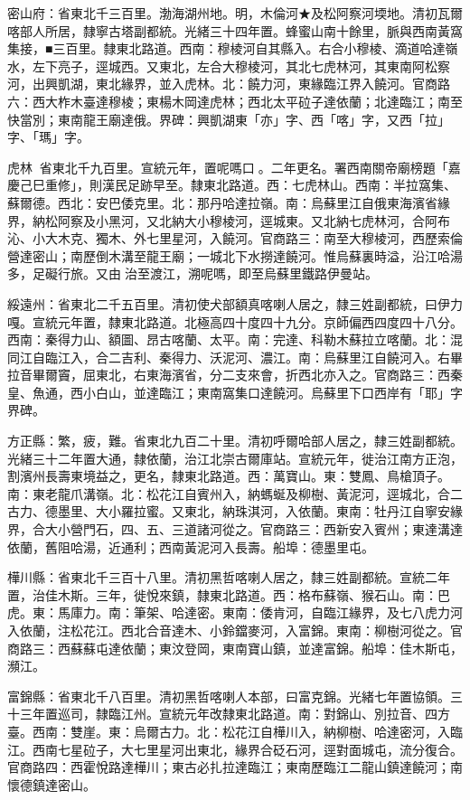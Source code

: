 \begin{pinyinscope}
密山府：省東北千三百里。渤海湖州地。明，木倫河★及松阿察河堧地。清初瓦爾喀部人所居，隸寧古塔副都統。光緒三十四年置。蜂蜜山南十餘里，脈與西南黃窩集接，■三百里。隸東北路道。西南：穆棱河自其縣入。右合小穆棱、滴道哈達嶺水，左下亮子，逕城西。又東北，左合大穆棱河，其北七虎林河，其東南阿松察河，出興凱湖，東北緣界，並入虎林。北：饒力河，東緣臨江界入饒河。官商路六：西大柞木臺達穆棱；東楊木岡達虎林；西北太平砬子達依蘭；北達臨江；南至快當別；東南龍王廟達俄。界碑：興凱湖東「亦」字、西「喀」字，又西「拉」字、「瑪」字。

虎林：省東北千九百里。宣統元年，置呢嗎口。二年更名。署西南關帝廟榜題「嘉慶己巳重修」，則漢民足跡早至。隸東北路道。西：七虎林山。西南：半拉窩集、蘇爾德。西北：安巴倭克里。北：那丹哈達拉嶺。南：烏蘇里江自俄東海濱省緣界，納松阿察及小黑河，又北納大小穆棱河，逕城東。又北納七虎林河，合阿布沁、小大木克、獨木、外七里星河，入饒河。官商路三：南至大穆棱河，西歷索倫營達密山；南歷倒木溝至龍王廟；一城北下水撈達饒河。惟烏蘇裏時溢，沿江哈湯多，足礙行旅。又由治至渡江，溯呢嗎，即至烏蘇里鐵路伊曼站。

綏遠州：省東北二千五百里。清初使犬部額真喀喇人居之，隸三姓副都統，曰伊力嘎。宣統元年置，隸東北路道。北極高四十度四十九分。京師偏西四度四十八分。西南：秦得力山、額圖、昂古喀蘭、太平。南：完達、科勒木蘇拉立喀蘭。北：混同江自臨江入，合二吉利、秦得力、沃泥河、濃江。南：烏蘇里江自饒河入。右畢拉音畢爾竇，屈東北，右東海濱省，分二支來會，折西北亦入之。官商路三：西秦皇、魚通，西小白山，並達臨江；東南窩集口達饒河。烏蘇里下口西岸有「耶」字界碑。

方正縣：繁，疲，難。省東北九百二十里。清初呼爾哈部人居之，隸三姓副都統。光緒三十二年置大通，隸依蘭，治江北崇古爾庫站。宣統元年，徙治江南方正泡，割濱州長壽東境益之，更名，隸東北路道。西：萬寶山。東：雙鳳、鳥槍頂子。南：東老龍爪溝嶺。北：松花江自賓州入，納螞蜒及柳樹、黃泥河，逕城北，合二古力、德墨里、大小羅拉蜜。又東北，納珠淇河，入依蘭。東南：牡丹江自寧安緣界，合大小營門石，四、五、三道諸河從之。官商路三：西新安入賓州；東達溝達依蘭，舊阻哈湯，近通利；西南黃泥河入長壽。船埠：德墨里屯。

樺川縣：省東北千三百十八里。清初黑哲喀喇人居之，隸三姓副都統。宣統二年置，治佳木斯。三年，徙悅來鎮，隸東北路道。西：格布蘇嶺、猴石山。南：巴虎。東：馬庫力。南：筆架、哈達密。東南：倭肯河，自臨江緣界，及七八虎力河入依蘭，注松花江。西北合音達木、小鈴鐺麥河，入富錦。東南：柳樹河從之。官商路三：西蘇蘇屯達依蘭；東汶登岡，東南寶山鎮，並達富錦。船埠：佳木斯屯，瀕江。

富錦縣：省東北千八百里。清初黑哲喀喇人本部，曰富克錦。光緒七年置協領。三十三年置巡司，隸臨江州。宣統元年改隸東北路道。南：對錦山、別拉音、四方臺。西南：雙崖。東：烏爾古力。北：松花江自樺川入，納柳樹、哈達密河，入臨江。西南七星砬子，大七里星河出東北，緣界合砭石河，逕對面城屯，流分復合。官商路四：西霍悅路達樺川；東古必扎拉達臨江；東南歷臨江二龍山鎮達饒河；南懷德鎮達密山。


\end{pinyinscope}
